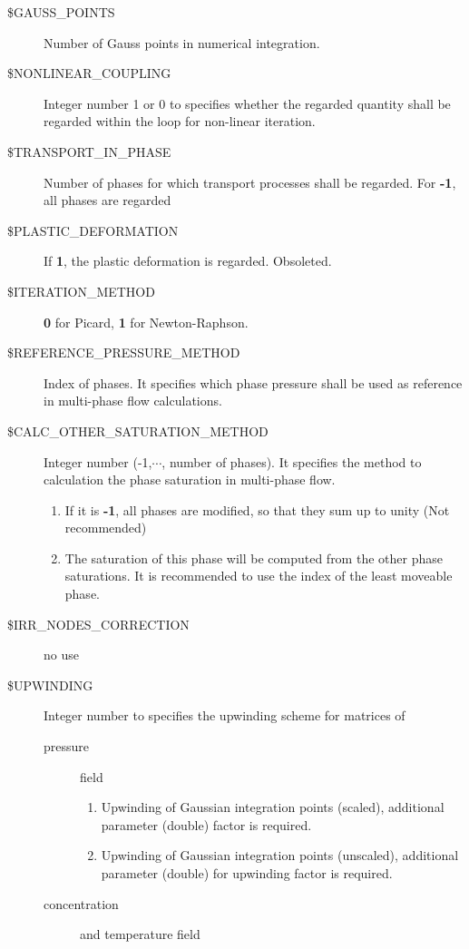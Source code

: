 \begin{description}
{    }
    \item[\$GAUSS\_POINTS] Number of Gauss points in numerical integration.
    \item[\$NONLINEAR\_COUPLING] Integer number 1 or 0 to specifies whether the regarded quantity shall be
                                 regarded within the loop for non-linear iteration.
    \item[\$TRANSPORT\_IN\_PHASE] Number of phases for which transport processes shall be regarded. For
                  \textbf{-1}, all phases are regarded
    \item[\$PLASTIC\_DEFORMATION] If \textbf{1}, the plastic deformation is regarded. Obsoleted.
    \item[\$ITERATION\_METHOD]   \textbf{0} for Picard,  \textbf{1} for Newton-Raphson.
    \item[\$REFERENCE\_PRESSURE\_METHOD]  Index of phases. It specifies which phase pressure shall be used as reference
          in multi-phase flow calculations.
    \item[\$CALC\_OTHER\_SATURATION\_METHOD] Integer number (-1,$\cdots$, number of phases). It specifies
     the method to calculation the phase saturation in multi-phase flow.
    {
      \begin{enumerate}
      \item If it is \textbf{-1},  all phases are modified, so that they sum up to unity (Not recommended)
      \item The saturation of this phase will be computed from the other phase saturations. It is recommended
            to use the index of the least moveable phase.
      \end{enumerate}
    }
    \item[\$IRR\_NODES\_CORRECTION] no use
    \item[\$UPWINDING] Integer number to specifies the upwinding scheme for matrices of
    {
      \begin{description}
        \item[pressure ] field
        {
          \begin{enumerate}
          \item Upwinding of Gaussian integration points (scaled), additional parameter (double) factor is required.
          \item Upwinding of Gaussian integration points (unscaled), additional parameter (double) for upwinding
                factor is required.
          \end{enumerate}
        }
        \item[concentration] and temperature field

\end{description}}
\end{description}
